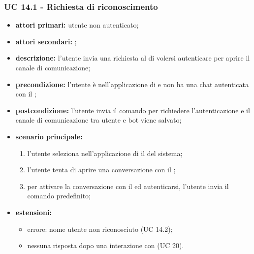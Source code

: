 	\subsubsection{UC 14.1 - Richiesta di riconoscimento}

	\begin{itemize}
		\item \textbf{attori primari:} utente non autenticato;
		\item \textbf{attori secondari:} ;
		\item \textbf{descrizione:} l'utente invia una richiesta al  di volersi autenticare per aprire il canale di comunicazione;
		\item \textbf{precondizione:} l'utente è nell'applicazione di  e non ha una chat autenticata con il ;
		\item \textbf{postcondizione:} l'utente invia il comando per richiedere l'autenticazione e il canale di comunicazione tra utente e bot viene salvato;
		\item \textbf{scenario principale:}
			\begin{enumerate}
				\item l'utente seleziona nell'applicazione di  il  del sistema;
				\item l'utente tenta di aprire una conversazione con il ;
				\item per attivare la conversazione con il  ed autenticarsi, l'utente invia il comando predefinito;
			\end{enumerate}
		\item \textbf{estensioni:}
			\begin{itemize}
				\item errore: nome utente  non riconosciuto (UC 14.2);
				\item nessuna risposta dopo una interazione con  (UC 20).
			\end{itemize}
	\end{itemize}

